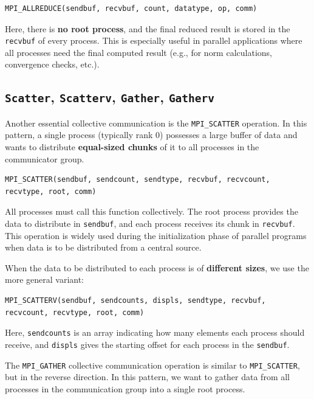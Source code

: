\documentclass[12pt]{book}
\begin{document}
\begin{lstlisting}[style=cppstyle]
MPI_ALLREDUCE(sendbuf, recvbuf, count, datatype, op, comm)
\end{lstlisting}
Here, there is \textbf{no root process}, and the final reduced result is stored in the \texttt{recvbuf} of every process. This is especially useful in parallel applications where all processes need the final computed result (e.g., for norm calculations, convergence checks, etc.).

\vspace{1em}

\subsection{\texttt{Scatter}, \texttt{Scatterv}, \texttt{Gather}, \texttt{Gatherv}}
Another essential collective communication is the \texttt{MPI\_SCATTER} operation. In this pattern, a single process (typically rank 0) possesses a large buffer of data and wants to distribute \textbf{equal-sized chunks} of it to all processes in the communicator group.

\begin{lstlisting}[style=cppstyle]
MPI_SCATTER(sendbuf, sendcount, sendtype, recvbuf, recvcount, recvtype, root, comm)
\end{lstlisting}


All processes must call this function collectively. The root process provides the data to distribute in \texttt{sendbuf}, and each process receives its chunk in \texttt{recvbuf}. This operation is widely used during the initialization phase of parallel programs when data is to be distributed from a central source.

When the data to be distributed to each process is of \textbf{different sizes}, we use the more general variant:

\begin{lstlisting}[style=cppstyle]
MPI_SCATTERV(sendbuf, sendcounts, displs, sendtype, recvbuf, recvcount, recvtype, root, comm)
\end{lstlisting}

Here, \texttt{sendcounts} is an array indicating how many elements each process should receive, and \texttt{displs} gives the starting offset for each process in the \texttt{sendbuf}.

The \texttt{MPI\_GATHER} collective communication operation is similar to \texttt{MPI\_SCATTER}, but in the reverse direction. In this pattern, we want to gather data from all processes in the communication group into a single root process.
\end{document}
